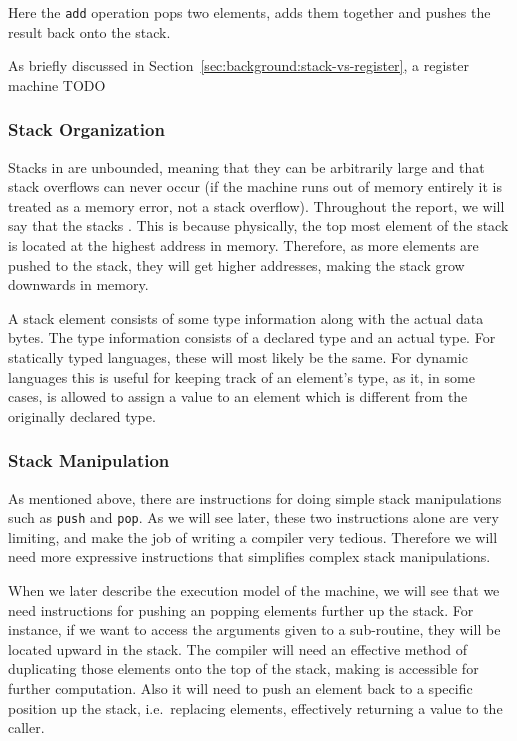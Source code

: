 Here the {\tt add} operation pops two elements, adds them together and pushes
the result back onto the stack.

As briefly discussed in Section~\ref{sec:background:stack-vs-register}, a
register machine TODO %

\subsubsection{Stack Organization}

Stacks in \thename{} are unbounded, meaning that they can be arbitrarily large
and that stack overflows can never occur (if the machine runs out of memory
entirely it is treated as a memory error, not a stack overflow). Throughout the
report, we will say that the stacks . This is because
physically, the top most element of the stack is located at the highest address
in memory. Therefore, as more elements are pushed to the stack, they will get
higher addresses, making the stack grow downwards in memory.

A stack element consists of some type information along with the actual data
bytes. The type information consists of a declared type and an actual type. For
statically typed languages, these will most likely be the same. For dynamic
languages this is useful for keeping track of an element's type, as it, in some
cases, is allowed to assign a value to an element which is different from the
originally declared type.

\subsubsection{Stack Manipulation}

As mentioned above, there are instructions for doing simple stack manipulations
such as {\tt push} and {\tt pop}. As we will see later, these two instructions
alone are very limiting, and make the job of writing a compiler very
tedious. Therefore we will need more expressive instructions that simplifies
complex stack manipulations.

When we later describe the execution model of the machine, we will see that we
need instructions for pushing an popping elements further up the stack. For
instance, if we want to access the arguments given to a sub-routine, they will
be located upward in the stack. The compiler will need an effective method of
duplicating those elements onto the top of the stack, making is accessible for
further computation. Also it will need to push an element back to a specific
position up the stack, i.e.~replacing elements, effectively returning a value to
the caller.


